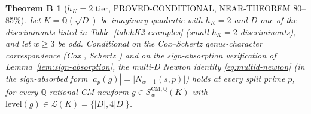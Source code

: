 \documentclass[11pt,a4paper]{amsart}
\newtheorem{theoremB}[theorem]{Theorem B}
\theoremstyle{definition}
\newcommand{\Q}{\mathbb{Q}}
\newcommand{\Lcal}{\mathcal{L}}
\newcommand{\Scal}{\mathcal{S}}
\newcommand{\hK}{h_{K}}
\begin{document}
\begin{theoremB}[$\hK = 2$ tier, PROVED-CONDITIONAL, NEAR-THEOREM 80--85\%]\label{thm:B}
Let $K = \Q(\sqrt{D})$ be imaginary quadratic with $\hK = 2$ and $D$ one of the discriminants listed in Table~\ref{tab:hK2-examples} (small $\hK = 2$ discriminants), and let $w \ge 3$ be odd. Conditional on the Cox--Schertz genus-character correspondence (Cox \cite[Thm.~3.15]{Cox2013}, Schertz \cite[\S6.3]{Schertz2010}) and on the sign-absorption verification of Lemma~\ref{lem:sign-absorption}, the multi-D Newton identity \eqref{eq:multid-newton} (in the sign-absorbed form $|a_p(g)| = |N_{w-1}(s,p)|$) holds at every split prime $p$, for every $\Q$-rational CM newform $g \in \Scal_w^{\mathrm{CM},\Q}(K)$ with $\mathrm{level}(g) \in \Lcal(K) = \{|D|, 4|D|\}$.
\end{theoremB}
\end{document}
